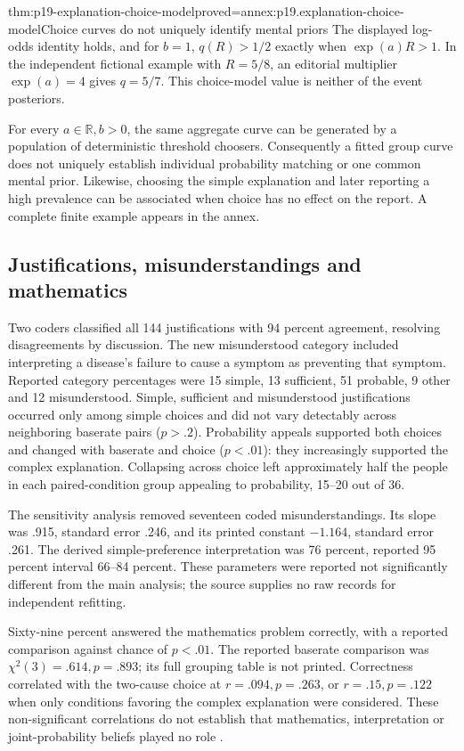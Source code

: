 \begin{hbtheorem}{thm:p19-explanation-choice-model}{proved=annex:p19.explanation-choice-model}{Choice curves do not uniquely identify mental priors}
The displayed log-odds identity holds, and for \(b=1\),
\(q(R)>1/2\) exactly when \(\exp(a)R>1\).
In the independent fictional example with \(R=5/8\),
an editorial multiplier \(\exp(a)=4\) gives \(q=5/7\).
This choice-model value is neither of the event posteriors.

For every \(a\in\mathbb R,b>0\), the same aggregate curve can
be generated by a population of deterministic threshold choosers.
Consequently a fitted group curve does not uniquely establish
individual probability matching or one common mental prior.
Likewise, choosing the simple explanation and later reporting
a high prevalence can be associated when choice has no effect
on the report. A complete finite example appears in the annex.
\end{hbtheorem}

\subsection{Justifications, misunderstandings and mathematics}

Two coders classified all 144 justifications with 94 percent
agreement, resolving disagreements by discussion.
The new misunderstood category included interpreting a disease's
failure to cause a symptom as preventing that symptom.
Reported category percentages were 15 simple, 13 sufficient,
51 probable, 9 other and 12 misunderstood.
Simple, sufficient and misunderstood justifications occurred only
among simple choices and did not vary detectably across neighboring
baserate pairs (\(p>.2\)). Probability appeals supported both
choices and changed with baserate and choice (\(p<.01\)):
they increasingly supported the complex explanation.
Collapsing across choice left approximately half the people
in each paired-condition group appealing to probability,
15--20 out of 36.

The sensitivity analysis removed seventeen coded misunderstandings.
Its slope was .915, standard error .246, and its printed constant
\(-1.164\), standard error .261. The derived simple-preference
interpretation was 76 percent, reported 95 percent interval
66--84 percent. These parameters were reported not significantly
different from the main analysis; the source supplies no raw
records for independent refitting.

Sixty-nine percent answered the mathematics problem correctly,
with a reported comparison against chance of \(p<.01\).
The reported baserate comparison was
\(\chi^2(3)=.614,p=.893\); its full grouping table is not printed.
Correctness correlated with the two-cause choice at \(r=.094,p=.263\),
or \(r=.15,p=.122\) when only conditions favoring the complex
explanation were considered. These non-significant correlations
do not establish that mathematics, interpretation or joint-probability
beliefs played no role \cite[pp.~242--243, note~5]{Lombrozo2007SimplicityProbability}.


